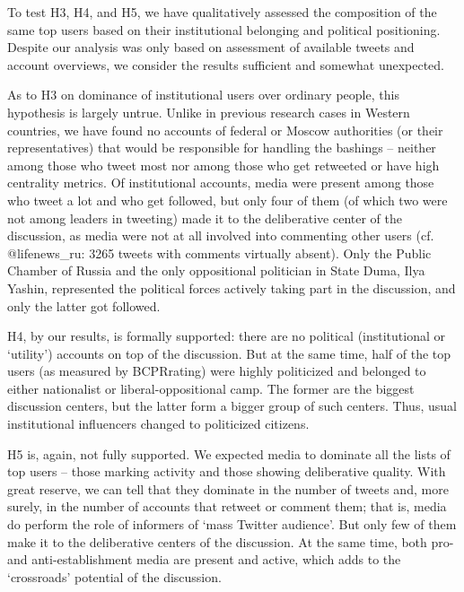 To test H3, H4, and H5, we have qualitatively assessed the composition of the same top users based on their institutional belonging and political positioning. Despite our analysis was only based on assessment of available tweets and account overviews, we consider the results sufficient and somewhat unexpected.

As to H3 on dominance of institutional users over ordinary people, this hypothesis is largely untrue. Unlike in previous research cases in Western countries, we have found no accounts of federal or Moscow authorities (or their representatives) that would be responsible for handling the bashings -- neither among those who tweet most nor among those who get retweeted or have high centrality metrics. Of institutional accounts, media were present among those who tweet a lot and who get followed, but only four of them (of which two were not among leaders in tweeting) made it to the deliberative center of the discussion, as media were not at all involved into commenting other users (cf. @lifenews\_ru: 3265 tweets with comments virtually absent). Only the Public Chamber of Russia and the only oppositional politician in State Duma, Ilya Yashin, represented the political forces actively taking part in the discussion, and only the latter got followed.

H4, by our results, is formally supported: there are no political (institutional or ‘utility’) accounts on top of the discussion. But at the same time, half of the top users (as measured by BCPRrating) were highly politicized and belonged to either nationalist or liberal-oppositional camp. The former are the biggest discussion centers, but the latter form a bigger group of such centers. Thus, usual institutional influencers changed to politicized citizens.

H5 is, again, not fully supported. We expected media to dominate all the lists of top users – those marking activity and those showing deliberative quality. With great reserve, we can tell that they dominate in the number of tweets and, more surely, in the number of accounts that retweet or comment them; that is, media do perform the role of informers of ‘mass Twitter audience’. But only few of them make it to the deliberative centers of the discussion. At the same time, both pro- and anti-establishment media are present and active, which adds to the ‘crossroads’ potential of the discussion.

